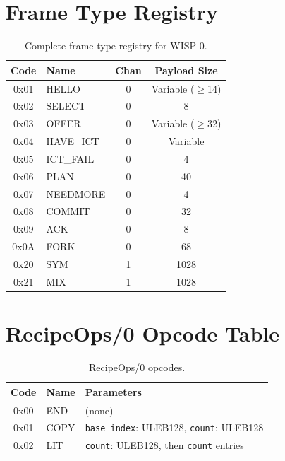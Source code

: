\documentclass[11pt,twocolumn]{article}
\theoremstyle{definition}
\begin{document}
\appendix

\section{Frame Type Registry}
\label{app:frames}

\begin{table}[h]
\centering
\caption{Complete frame type registry for WISP-0.}
\begin{tabular}{@{}clcc@{}}
\toprule
Code & Name & Chan & Payload Size \\
\midrule
0x01 & HELLO     & 0 & Variable ($\geq$14) \\
0x02 & SELECT    & 0 & 8 \\
0x03 & OFFER     & 0 & Variable ($\geq$32) \\
0x04 & HAVE\_ICT & 0 & Variable \\
0x05 & ICT\_FAIL & 0 & 4 \\
0x06 & PLAN      & 0 & 40 \\
0x07 & NEEDMORE  & 0 & 4 \\
0x08 & COMMIT    & 0 & 32 \\
0x09 & ACK       & 0 & 8 \\
0x0A & FORK      & 0 & 68 \\
0x20 & SYM       & 1 & 1028 \\
0x21 & MIX       & 1 & 1028 \\
\bottomrule
\end{tabular}
\end{table}


\section{RecipeOps/0 Opcode Table}
\label{app:opcodes}

\begin{table}[h]
\centering
\caption{RecipeOps/0 opcodes.}
\begin{tabular}{@{}cll@{}}
\toprule
Code & Name & Parameters \\
\midrule
0x00 & END  & (none) \\
0x01 & COPY & \texttt{base\_index}: ULEB128, \texttt{count}: ULEB128 \\
0x02 & LIT  & \texttt{count}: ULEB128, then \texttt{count} entries \\
\bottomrule
\end{tabular}
\end{table}
\end{document}
